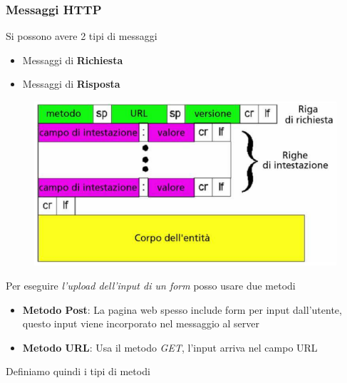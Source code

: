 \documentclass{article}
\newcounter{subsubsubsection}[subsubsection]
\begin{document}
            \subsubsection{Messaggi HTTP}
                Si possono avere 2 tipi di messaggi
                \begin{itemize}
                    \item Messaggi di \textbf{Richiesta}
                    \item Messaggi di \textbf{Risposta}
                \end{itemize}

                \begin{figure}[H]
                    \centering
                    \includegraphics[width=\textwidth]{pic/richiesta_http.png}
                    \label{Messaggi di RIchiesta HTTP}
                \end{figure}
                Per eseguire \textit{l'upload dell'input di un form} posso usare due metodi
                \begin{itemize}
                    \item \textbf{Metodo Post}: La pagina web spesso include form per input dall'utente, questo input viene incorporato nel messaggio al server
                    \item \textbf{Metodo URL}: Usa il metodo \textit{GET}, l'input arriva nel campo URL
                \end{itemize}
                Definiamo quindi i tipi di metodi
\end{document}
